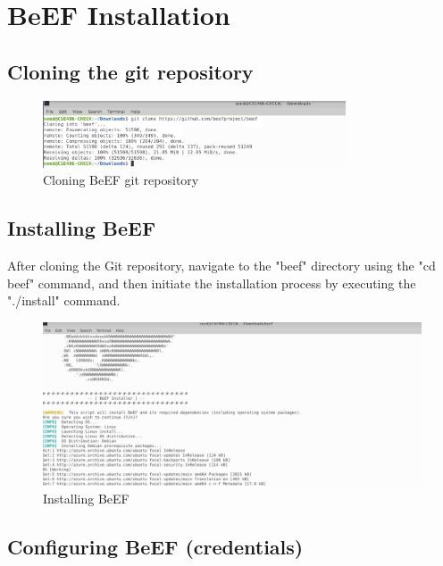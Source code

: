 \documentclass{report}
\begin{document}
 


\chapter{BeEF Installation}

\section{Cloning the git repository}
\begin{figure}[h]
    \centering
    \includegraphics[width=0.80\textwidth]{Installation/install1.png}
    \caption{Cloning BeEF git repository}
    \label{fig:install1}
\end{figure}



\section{Installing BeEF}
After cloning the Git repository, navigate to the "beef" directory using the "cd beef" command, and then initiate the installation process by executing the "./install" command.


\begin{figure}[h]
    \centering
    \includegraphics[width=1.0\textwidth]{Installation/install2.png}
    \caption{Installing BeEF}
    \label{fig:install2}
\end{figure}

\clearpage





\section{Configuring BeEF (credentials)}
\end{document}
